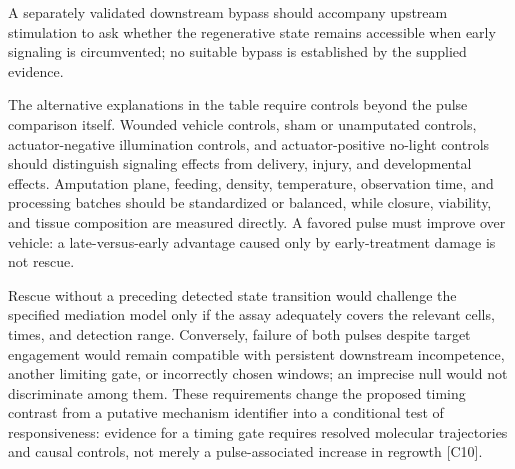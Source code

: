 \documentclass[11pt]{article}
\begin{document}
A separately validated downstream bypass should accompany upstream stimulation to ask whether the regenerative state remains accessible when early signaling is circumvented; no suitable bypass is established by the supplied evidence.

The alternative explanations in the table require controls beyond the pulse comparison itself. Wounded vehicle controls, sham or unamputated controls, actuator-negative illumination controls, and actuator-positive no-light controls should distinguish signaling effects from delivery, injury, and developmental effects. Amputation plane, feeding, density, temperature, observation time, and processing batches should be standardized or balanced, while closure, viability, and tissue composition are measured directly. A favored pulse must improve over vehicle: a late-versus-early advantage caused only by early-treatment damage is not rescue.

Rescue without a preceding detected state transition would challenge the specified mediation model only if the assay adequately covers the relevant cells, times, and detection range. Conversely, failure of both pulses despite target engagement would remain compatible with persistent downstream incompetence, another limiting gate, or incorrectly chosen windows; an imprecise null would not discriminate among them. These requirements change the proposed timing contrast from a putative mechanism identifier into a conditional test of responsiveness: evidence for a timing gate requires resolved molecular trajectories and causal controls, not merely a pulse-associated increase in regrowth [C10].
\end{document}
